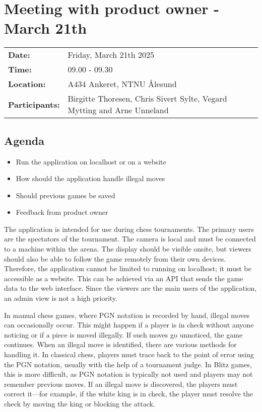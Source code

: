 \section{Meeting with product owner - March 21th}
\begin{tabular}{ll}
    \textbf{Date:} & Friday, March 21th 2025 \\
    \textbf{Time:} & 09.00 - 09.30\\
    \textbf{Location:} & A434 Ankeret, NTNU Ålesund \\
    \textbf{Participants:} & Birgitte Thoresen, Chris Sivert Sylte, Vegard Mytting and Arne Unneland\\
\end{tabular}

\vspace{0.5cm}

\subsection{Agenda}

\begin{itemize} 
    \item Run the application on localhost or on a website 
    \item How should the application handle illegal moves 
    \item Should previous games be saved 
    \item Feedback from product owner 
\end{itemize}

The application is intended for use during chess tournaments. The primary users are the spectators of the tournament. The camera is local and must be connected to a machine within the arena. The display should be visible onsite, but viewers should also be able to follow the game remotely from their own devices. Therefore, the application cannot be limited to running on localhost; it must be accessible as a website. This can be achieved via an API that sends the game data to the web interface. Since the viewers are the main users of the application, an admin view is not a high priority.

In manual chess games, where PGN notation is recorded by hand, illegal moves can occasionally occur. This might happen if a player is in check without anyone noticing or if a piece is moved illegally. If such moves go unnoticed, the game continues. When an illegal move is identified, there are various methods for handling it. In classical chess, players must trace back to the point of error using the PGN notation, usually with the help of a tournament judge. In Blitz games, this is more difficult, as PGN notation is typically not used and players may not remember previous moves. If an illegal move is discovered, the players must correct it—for example, if the white king is in check, the player must resolve the check by moving the king or blocking the attack.

